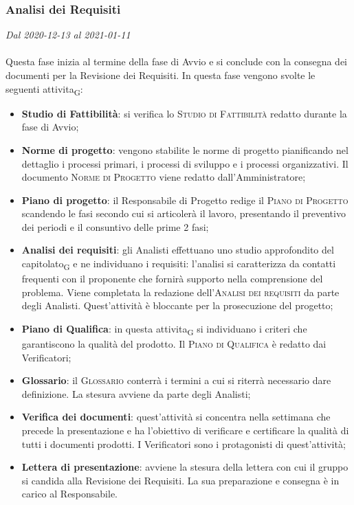 \subsubsection{Analisi dei Requisiti}

\textit{Dal 2020-12-13 al 2021-01-11}
\\\\
Questa fase inizia al termine della fase di Avvio e si conclude con la consegna dei documenti per la Revisione dei Requisiti.
In questa fase vengono svolte le seguenti \gls{attivita}\textsubscript{G}:
\begin{itemize}
	\item \textbf{Studio di Fattibilità}: si verifica lo \textsc{Studio di Fattibilità} redatto durante la fase di Avvio;
	\item \textbf{Norme di progetto}: vengono stabilite le norme di progetto pianificando nel dettaglio i processi primari, i processi di sviluppo e i processi organizzativi. Il documento \textsc{Norme di Progetto} viene redatto dall'Amministratore;
	\item \textbf{Piano di progetto}: il Responsabile di Progetto redige il \textsc{Piano di Progetto} scandendo le fasi secondo cui si articolerà il lavoro, presentando il preventivo dei periodi e il consuntivo delle prime 2 fasi;
	\item \textbf{Analisi dei requisiti}: gli Analisti effettuano uno studio approfondito del \gls{capitolato}\textsubscript{G} e ne individuano i requisiti: l'analisi si caratterizza da contatti frequenti con il proponente che fornirà supporto nella comprensione del problema. Viene completata la redazione dell'\textsc{Analisi dei requisiti} da parte degli Analisti. Quest'attività è bloccante per la prosecuzione del progetto;
	\item \textbf{Piano di Qualifica}: in questa \gls{attivita}\textsubscript{G} si individuano i criteri che garantiscono la qualità del prodotto. Il \textsc{Piano di Qualifica} è redatto dai Verificatori;
	\item \textbf{Glossario}: il \textsc{Glossario} conterrà i termini a cui si riterrà necessario dare definizione. La stesura avviene da parte degli Analisti;
	\item \textbf{Verifica dei documenti}: quest'attività si concentra nella settimana che precede la presentazione e ha l'obiettivo di verificare e certificare la qualità di tutti i documenti prodotti. I Verificatori sono i protagonisti di quest'attività;
	\item \textbf{Lettera di presentazione}: avviene la stesura della lettera con cui il gruppo si candida alla Revisione dei Requisiti. La sua preparazione e consegna è in carico al Responsabile.
\end{itemize}

